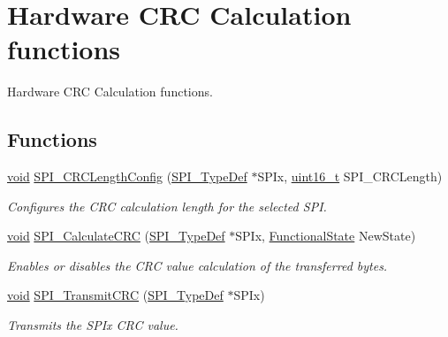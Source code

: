 \hypertarget{group___s_p_i___group3}{\section{Hardware C\-R\-C Calculation functions}
\label{group___s_p_i___group3}
}


Hardware C\-R\-C Calculation functions.  


\subsection*{Functions}
\begin{DoxyCompactItemize}
\item 
\hyperlink{group___n_a_m_e_ga18028b8badbf1ea7e704ccac3c488e82}{void} \hyperlink{group___s_p_i___group3_gad178588d8115c4fb6a21fdcbfa42d45e}{S\-P\-I\-\_\-\-C\-R\-C\-Length\-Config} (\hyperlink{struct_s_p_i___type_def}{S\-P\-I\-\_\-\-Type\-Def} $\ast$S\-P\-Ix, \hyperlink{stdint_8h_a273cf69d639a59973b6019625df33e30}{uint16\-\_\-t} S\-P\-I\-\_\-\-C\-R\-C\-Length)
\begin{DoxyCompactList}\small\item\em Configures the C\-R\-C calculation length for the selected S\-P\-I. \end{DoxyCompactList}\item 
\hyperlink{group___n_a_m_e_ga18028b8badbf1ea7e704ccac3c488e82}{void} \hyperlink{group___s_p_i___group3_ga64f7276d119e6cb58afc100f8832adb0}{S\-P\-I\-\_\-\-Calculate\-C\-R\-C} (\hyperlink{struct_s_p_i___type_def}{S\-P\-I\-\_\-\-Type\-Def} $\ast$S\-P\-Ix, \hyperlink{group___exported__types_gac9a7e9a35d2513ec15c3b537aaa4fba1}{Functional\-State} New\-State)
\begin{DoxyCompactList}\small\item\em Enables or disables the C\-R\-C value calculation of the transferred bytes. \end{DoxyCompactList}\item 
\hyperlink{group___n_a_m_e_ga18028b8badbf1ea7e704ccac3c488e82}{void} \hyperlink{group___s_p_i___group3_gace8b1058e09bab150b0dbe5978810273}{S\-P\-I\-\_\-\-Transmit\-C\-R\-C} (\hyperlink{struct_s_p_i___type_def}{S\-P\-I\-\_\-\-Type\-Def} $\ast$S\-P\-Ix)
\begin{DoxyCompactList}\small\item\em Transmits the S\-P\-Ix C\-R\-C value. \end{DoxyCompactList}\item 

\end{DoxyCompactItemize}
